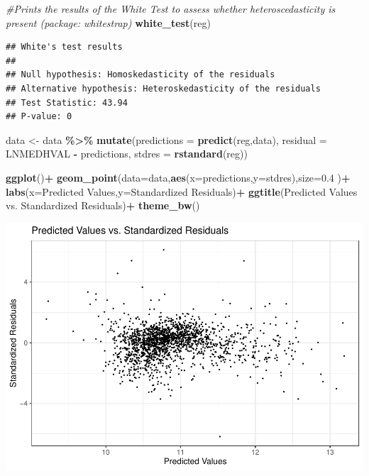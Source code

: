 \documentclass[
]{article}
\newenvironment{Shaded}{\begin{snugshade}}{\end{snugshade}}
\newcommand{\AttributeTok}[1]{\textcolor[rgb]{0.13,0.29,0.53}{#1}}
\newcommand{\CommentTok}[1]{\textcolor[rgb]{0.56,0.35,0.01}{\textit{#1}}}
\newcommand{\FloatTok}[1]{\textcolor[rgb]{0.00,0.00,0.81}{#1}}
\newcommand{\FunctionTok}[1]{\textcolor[rgb]{0.13,0.29,0.53}{\textbf{#1}}}
\newcommand{\NormalTok}[1]{#1}
\newcommand{\OtherTok}[1]{\textcolor[rgb]{0.56,0.35,0.01}{#1}}
\newcommand{\SpecialCharTok}[1]{\textcolor[rgb]{0.81,0.36,0.00}{\textbf{#1}}}
\newcommand{\StringTok}[1]{\textcolor[rgb]{0.31,0.60,0.02}{#1}}
\begin{document}
\begin{Shaded}
\begin{Highlighting}[]
\CommentTok{\#Prints the results of the White Test to assess whether heteroscedasticity is present (package: whitestrap)}
\FunctionTok{white\_test}\NormalTok{(reg)}
\end{Highlighting}
\end{Shaded}

\begin{verbatim}
## White's test results
## 
## Null hypothesis: Homoskedasticity of the residuals
## Alternative hypothesis: Heteroskedasticity of the residuals
## Test Statistic: 43.94
## P-value: 0
\end{verbatim}

\begin{Shaded}
\begin{Highlighting}[]
\NormalTok{data }\OtherTok{\textless{}{-}}\NormalTok{ data }\SpecialCharTok{\%\textgreater{}\%}
  \FunctionTok{mutate}\NormalTok{(}\AttributeTok{predictions =} \FunctionTok{predict}\NormalTok{(reg,data),}
        \AttributeTok{residual =}\NormalTok{ LNMEDHVAL }\SpecialCharTok{{-}}\NormalTok{ predictions,}
        \AttributeTok{stdres =} \FunctionTok{rstandard}\NormalTok{(reg))}

\FunctionTok{ggplot}\NormalTok{()}\SpecialCharTok{+}
  \FunctionTok{geom\_point}\NormalTok{(}\AttributeTok{data=}\NormalTok{data,}\FunctionTok{aes}\NormalTok{(}\AttributeTok{x=}\NormalTok{predictions,}\AttributeTok{y=}\NormalTok{stdres),}\AttributeTok{size=}\FloatTok{0.4}
\NormalTok{            )}\SpecialCharTok{+}
  \FunctionTok{labs}\NormalTok{(}\AttributeTok{x=}\StringTok{\textquotesingle{}Predicted Values\textquotesingle{}}\NormalTok{,}\AttributeTok{y=}\StringTok{\textquotesingle{}Standardized Residuals\textquotesingle{}}\NormalTok{)}\SpecialCharTok{+}
  \FunctionTok{ggtitle}\NormalTok{(}\StringTok{\textquotesingle{}Predicted Values vs. Standardized Residuals\textquotesingle{}}\NormalTok{)}\SpecialCharTok{+}
  \FunctionTok{theme\_bw}\NormalTok{()}
\end{Highlighting}
\end{Shaded}

\includegraphics{HW2-SpatialRegression_files/figure-latex/scatter_plot-1.pdf}
\end{document}
